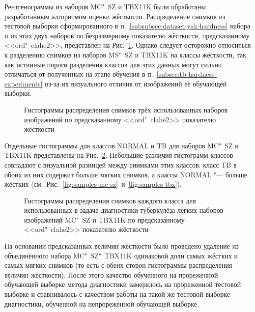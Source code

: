 Рентгенограммы из наборов MC"~SZ и TBX11K были обработаны разработанным алгоритмом оценки жёсткости. Распределение снимков из тестовой выборки сформированного в п.~\ref{subsubsec:dataset-yak-hardness} набора и из этих двух наборов по безразмерному показателю жёсткости, предсказанному  <<ord"~clahe2>>, представлен на Рис.~\ref{fig:ordinal-hist-total}. Однако следует осторожно относиться к разделению снимков из наборов MS"~SZ и TBX11K на классы жёсткости, так как истинные пороги разделения классов для этих данных могут сильно отличаться от полученных  на этапе обучения в п.~\ref{subsec:tb-hardness-experiments} из-за их визуального отличия от изображений её обучающей выборки.

\begin{figure}[ht]
	\caption{Гистограммы распределения снимков трёх использованных наборов изображений по предсказанному  <<ord"~clahe2>> показателю жёсткости}
	\label{fig:ordinal-hist-total}
\end{figure}

Отдельные гистограммы для классов NORMAL и TB для наборов MC"~SZ и TBX11K представлены на Рис.~\ref{fig:ordinal-hist-datasetwise}. Небольшие различия гистограмм классов совпадают с визуальной разницей между снимками этих классов: класс TB в обоих из них содержит больше мягких снимков, а классы NORMAL "--- больше жёстких (см.~Рис.~\ref{fig:samples-mc-sz}~и~\ref{fig:samples-tbx}).

\begin{figure}[ht]
	\caption{Гистограммы распределения снимков каждого класса для использованных в задаче диагностики туберкулёза лёгких наборов изображений MC"~SZ и TBX11K по предсказанному  <<ord"~clahe2>> показателю жёсткости}
	\label{fig:ordinal-hist-datasetwise}
\end{figure}

На основании предсказанных величин жёсткости было проведено удаление из объединённого набора MC"~SZ"~TBX11K одинаковой доли самых жёстких и самых мягких снимков (то есть с обеих сторон гистограммы распределения величин жёсткости). После этого качество обученного на прореженной обучающей выборке метода диагностики замерялось на прореженной тестовой выборке и сравнивалось с качеством работы на такой же тестовой выборке  диагностики, обученной на непрореженной обучающей выборке.

